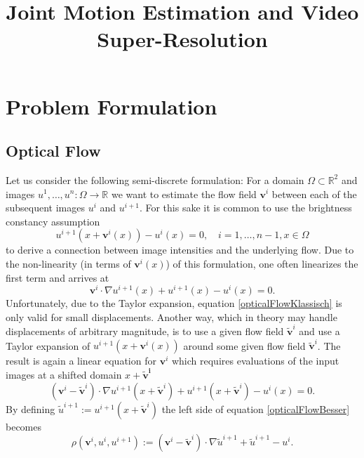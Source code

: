 \documentclass[final,leqno,onefignum,onetabnum]{article}
\title{Joint Motion Estimation and Video Super-Resolution}
\newcommand{\R}{\mathbb{R}}
\newcommand{\1}[1]{\mathds{1}_{#1}}
\begin{document}
	
\maketitle

\section{Problem Formulation}
\subsection{Optical Flow}
Let us consider the following semi-discrete formulation:
For a domain $\Omega\subset\R^2$ and images $u^1,\ldots,u^n : \Omega\rightarrow\R$  we want to estimate the flow field $\boldsymbol{v}^i$ between each of the subsequent images $u^{i}$ and $u^{i+1}$. For this sake it is common to use the brightness constancy assumption 
\begin{equation}
	u^{i+1}(x+\boldsymbol{v}^i(x)) - u^i(x) = 0,\quad i=1,\ldots,n-1,x\in\Omega
	\label{opticalFlowKomplett}
\end{equation}
to derive a connection between image intensities and the underlying flow. Due to the non-linearity (in terms of $\boldsymbol{v}^i(x)$) of this formulation, one often linearizes the first term and arrives at
\begin{equation}
	\boldsymbol{v}^i\cdot\nabla u^{i+1}(x) + u^{i+1}(x) - u^i(x) = 0.
	\label{opticalFlowKlassisch}
\end{equation}
Unfortunately, due to the Taylor expansion, equation \eqref{opticalFlowKlassisch} is only valid for small displacements. Another way, which in theory may handle displacements of arbitrary magnitude, is to use a given flow field $\boldsymbol{\tilde{v}}^i$ and use a Taylor expansion of $u^{i+1}(x+\boldsymbol{v}^i(x))$ around some given flow field $\boldsymbol{\tilde{v}}^i$. The result is again a linear equation for $\boldsymbol{v}^i$ which requires evaluations of the input images at a shifted domain $x+\boldsymbol{\tilde{v}^i}$
\begin{equation}
	(\boldsymbol{v}^i-\boldsymbol{\tilde{v}}^i)\cdot\nabla u^{i+1}(x+\boldsymbol{\tilde{v}}^i) + u^{i+1}(x+\boldsymbol{\tilde{v}}^i) - u^i(x) = 0.
	\label{opticalFlowBesser}
\end{equation}
By defining $\tilde{u}^{i+1} := u^{i+1}(x+\boldsymbol{\tilde{v}}^i)$ the left side of equation \eqref{opticalFlowBesser} becomes
\begin{equation}
	\rho(\boldsymbol{v}^i,u^{i},u^{i+1}) := (\boldsymbol{v}^i-\boldsymbol{\tilde{v}}^i)\cdot  \nabla\tilde{u}^{i+1} + \tilde{u}^{i+1} - u^i.
	\label{opticalFlowBesser2}
\end{equation}
\end{document}

